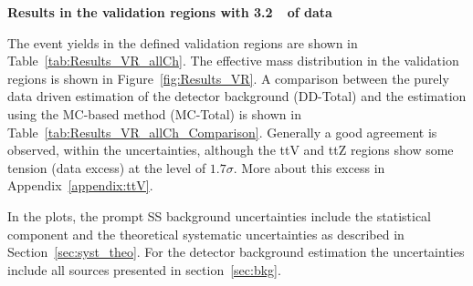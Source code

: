 \par{\bf Results in the validation regions with 3.2~\ifb\ of data\\}

The event yields in the defined validation regions are shown in Table~\ref{tab:Results_VR_allCh}. 
The effective mass distribution in the validation regions is shown in Figure~\ref{fig:Results_VR}. 
A comparison between the purely data driven estimation of the detector background (DD-Total) and the estimation using the MC-based method (MC-Total) is shown in Table~\ref{tab:Results_VR_allCh_Comparison}. Generally a good agreement is observed, within the uncertainties, although the ttV and ttZ regions show some tension (data excess) at the level of $1.7\sigma$. More about this excess in Appendix~\ref{appendix:ttV}.

In the plots, the prompt SS background uncertainties include the statistical component and the theoretical systematic uncertainties as described in Section~\ref{sec:syst_theo}. For the detector background estimation the uncertainties include all sources presented in section~\ref{sec:bkg}.


